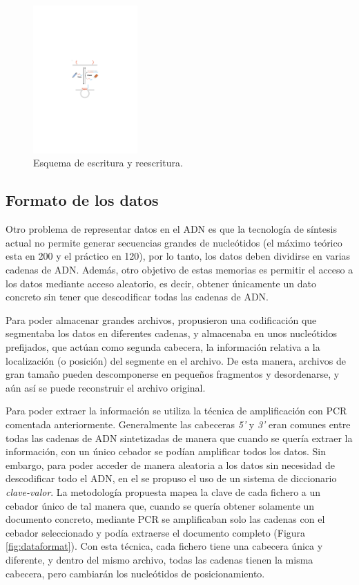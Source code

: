 \documentclass[a4paper,11pt]{article}
\begin{document}
\begin{figure}[h!]
\begin{center}
\includegraphics[width=4cm]{reescritura-2.pdf}
\caption{Esquema de escritura y reescritura.}
\label{fig:reescritura2}
\end{center}
\end{figure}

\subsection{Formato de los datos}

Otro problema de representar datos en el ADN es que la tecnología de síntesis actual no permite generar secuencias grandes de nucleótidos (el máximo teórico esta en 200 y el práctico en 120), por lo tanto, los datos deben dividirse en varias cadenas de ADN. Además, otro objetivo de estas memorias es permitir el acceso a los datos mediante acceso aleatorio, es decir, obtener únicamente un dato concreto sin tener que descodificar todas las cadenas de ADN.

Para poder almacenar grandes archivos, \citep{Goldman2013} propusieron una codificación que segmentaba los datos en diferentes cadenas, y almacenaba en unos nucleótidos prefijados, que actúan como segunda cabecera, la información relativa a la localización (o posición) del segmente en el archivo. De esta manera, archivos de gran tamaño pueden descomponerse en pequeños fragmentos y desordenarse, y aún así se puede reconstruir el archivo original.

Para poder extraer la información se utiliza la técnica de amplificación con PCR comentada anteriormente. Generalmente las cabeceras \textit{5’} y \textit{3’} eran comunes entre todas las cadenas de ADN sintetizadas de manera que cuando se quería extraer la información, con un único cebador se podían amplificar todos los datos. Sin embargo, para poder acceder de manera aleatoria a los datos sin necesidad de descodificar todo el ADN, en el \cite{Bornholt2017} se propuso el uso de un sistema de diccionario \textit{clave-valor}. La metodología propuesta mapea la clave de cada fichero a un cebador único de tal manera que, cuando se quería obtener solamente un documento concreto, mediante PCR se amplificaban solo las cadenas con el cebador seleccionado y podía extraerse el documento completo (Figura \ref{fig:dataformat}). Con esta técnica, cada fichero tiene una cabecera única y diferente, y dentro del mismo archivo, todas las cadenas tienen la misma cabecera, pero cambiarán los nucleótidos de posicionamiento.
\end{document}

